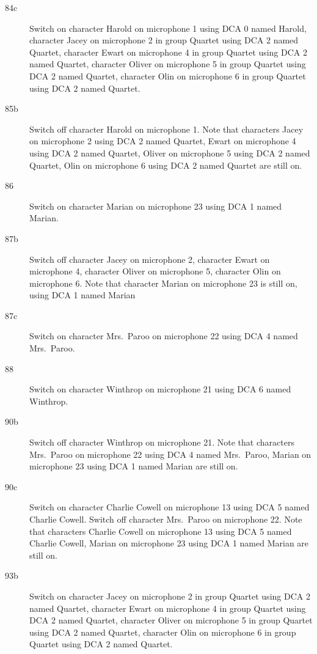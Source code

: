 \begin{description}
\item[84c]
Switch on character Harold on microphone 1 using DCA 0 named Harold, character Jacey on microphone 2 in group Quartet using DCA 2 named Quartet, character Ewart on microphone 4 in group Quartet using DCA 2 named Quartet, character Oliver on microphone 5 in group Quartet using DCA 2 named Quartet, character Olin on microphone 6 in group Quartet using DCA 2 named Quartet. 

\item[85b]
Switch off character Harold on microphone 1. Note that characters Jacey on microphone 2 using DCA 2 named Quartet, Ewart on microphone 4 using DCA 2 named Quartet, Oliver on microphone 5 using DCA 2 named Quartet, Olin on microphone 6 using DCA 2 named Quartet are still on.  

\item[86]
Switch on character Marian on microphone 23 using DCA 1 named Marian. 

\item[87b]
Switch off character Jacey on microphone 2, character Ewart on microphone 4, character Oliver on microphone 5, character Olin on microphone 6. Note that character Marian on microphone 23 is still on, using DCA 1 named Marian

\item[87c]
Switch on character Mrs.~Paroo on microphone 22 using DCA 4 named Mrs.~Paroo. 

\item[88]
Switch on character Winthrop on microphone 21 using DCA 6 named Winthrop. 

\item[90b]
Switch off character Winthrop on microphone 21. Note that characters Mrs.~Paroo on microphone 22 using DCA 4 named Mrs.~Paroo, Marian on microphone 23 using DCA 1 named Marian are still on.  

\item[90c]
Switch on character Charlie Cowell on microphone 13 using DCA 5 named Charlie Cowell. Switch off character Mrs.~Paroo on microphone 22. Note that characters Charlie Cowell on microphone 13 using DCA 5 named Charlie Cowell, Marian on microphone 23 using DCA 1 named Marian are still on.  

\item[93b]
Switch on character Jacey on microphone 2 in group Quartet using DCA 2 named Quartet, character Ewart on microphone 4 in group Quartet using DCA 2 named Quartet, character Oliver on microphone 5 in group Quartet using DCA 2 named Quartet, character Olin on microphone 6 in group Quartet using DCA 2 named Quartet. 


\end{description}

